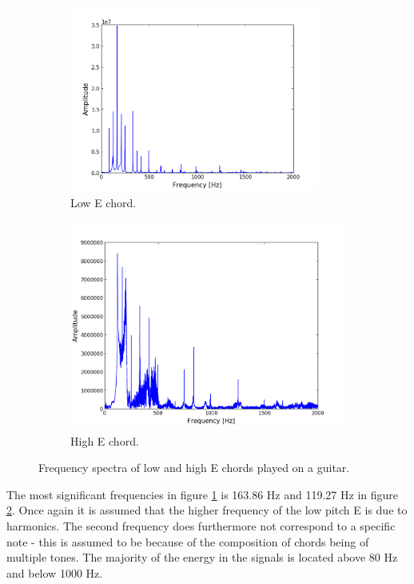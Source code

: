 \begin{figure}[H]
\centering
\begin{subfigure}{0.49\textwidth}
\centering
\includegraphics[width=0.9\textwidth]{figures/freqanal/chord_low.png}
\caption{Low E chord.}
\label{fig:chord_low}
\end{subfigure}
\begin{subfigure}{0.49\textwidth}
\centering
\includegraphics[width = \textwidth]{figures/freqanal/chord_high.png}
\caption{High E chord.}
\label{fig:chord_high}
\end{subfigure}
\caption{Frequency spectra of low and high E chords played on a guitar.}
\label{fig:chord}
\end{figure}

The most significant frequencies in figure \ref{fig:chord_low} is 163.86 Hz and 119.27 Hz in figure \ref{fig:chord_high}. Once again it is assumed that the higher frequency of the low pitch E is due to harmonics. The second frequency does furthermore not correspond to a specific note - this is assumed to be because of the composition of chords being of multiple tones. The majority of the energy in the signals is located above 80 Hz and below 1000 Hz.
